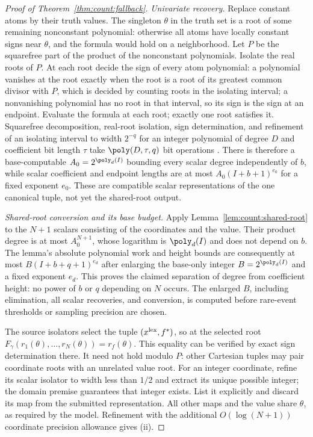 \begin{proof}[Proof of Theorem~\ref{thm:count:fallback}]
\emph{Univariate recovery.} Replace constant atoms by their truth values. The
singleton $\theta$ in the truth set is a root of some remaining nonconstant
polynomial: otherwise all atoms have locally constant signs near $\theta$, and
the formula would hold on a neighborhood. Let $P$ be the squarefree part of
the product of the nonconstant polynomials. Isolate the real roots of $P$.
At each root decide the sign of every atom polynomial: a polynomial vanishes
at the root exactly when the root is a root of its greatest common divisor
with $P$, which is decided by counting roots in the isolating interval; a
nonvanishing polynomial has no root in that interval, so its sign is the sign
at an endpoint. Evaluate the formula at each root; exactly one root satisfies
it. Squarefree decomposition, real-root isolation, sign determination, and
refinement of an isolating interval to width $2^{-q}$ for an integer
polynomial of degree $D$ and coefficient bit length $\tau$ take
$\poly(D,\tau,q)$ bit operations
\cite{basu2006-algorithms-in-real-algebraic-geometry}.
There is therefore a base-computable $A_0=2^{\poly_d(I)}$ bounding every
scalar degree independently of $b$, while scalar coefficient and endpoint
lengths are at most $A_0(I+b+1)^{e_0}$ for a fixed exponent $e_0$.
These are compatible scalar representations of the one canonical tuple,
not yet the shared-root output.

\emph{Shared-root conversion and its base budget.} Apply
Lemma~\ref{lem:count:shared-root} to the $N+1$ scalars consisting of the
coordinates and the value. Their product degree is at most
$A_0^{N+1}$, whose logarithm is $\poly_d(I)$ and does not depend on $b$.
The lemma's absolute polynomial work and height bounds are consequently
at most $B(I+b+q+1)^{e_d}$ after enlarging the base-only integer
$B=2^{\poly_d(I)}$ and a fixed exponent $e_d$. This proves the claimed
separation of degree from coefficient height: no power of $b$ or $q$
depending on $N$ occurs. The enlarged $B$, including elimination, all
scalar recoveries, and conversion, is computed before rare-event
thresholds or sampling precision are chosen.

The source isolators select the tuple
$(x^{\rm lex},f^*)$, so at the selected root
$F_\gamma(r_1(\theta),\dots,r_N(\theta))=r_f(\theta)$.
This equality can be verified by exact sign determination there. It need
not hold modulo $P$: other Cartesian tuples may pair coordinate roots
with an unrelated value root. For an integer coordinate, refine its scalar
isolator to width less than $1/2$ and extract its unique possible integer;
the domain premise guarantees that integer exists. List it explicitly and
discard its map from the submitted representation. All other maps and the
value share $\theta$, as required by the model. Refinement with the
additional $O(\log(N+1))$ coordinate precision allowance gives (ii).


\end{proof}
